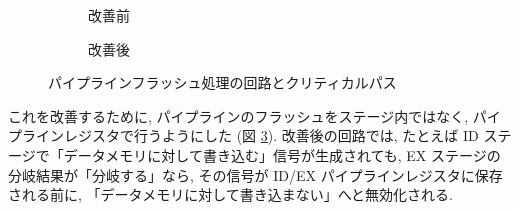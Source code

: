 \documentclass[../improvements.tex]{subfiles}
\begin{document}
  \begin{figure}
    \centering
    \begin{subfigure}{\columnwidth}
      \centering
      \caption{改善前}
      \label{fig:flush-and-critical-path-before}
    \end{subfigure}
    \begin{subfigure}{\columnwidth}
      \centering
      \caption{改善後}
      \label{fig:flush-and-critical-path-after}
    \end{subfigure}
    \caption{パイプラインフラッシュ処理の回路とクリティカルパス}
  \end{figure}

  これを改善するために, パイプラインのフラッシュをステージ内ではなく, 
  パイプラインレジスタで行うようにした (図 \ref{fig:flush-and-critical-path-after}).
  改善後の回路では, たとえば ID ステージで「データメモリに対して書き込む」信号が生成されても, 
  EX ステージの分岐結果が「分岐する」なら, 
  その信号が ID/EX パイプラインレジスタに保存される前に, 「データメモリに対して書き込まない」へと無効化される.
\end{document}
